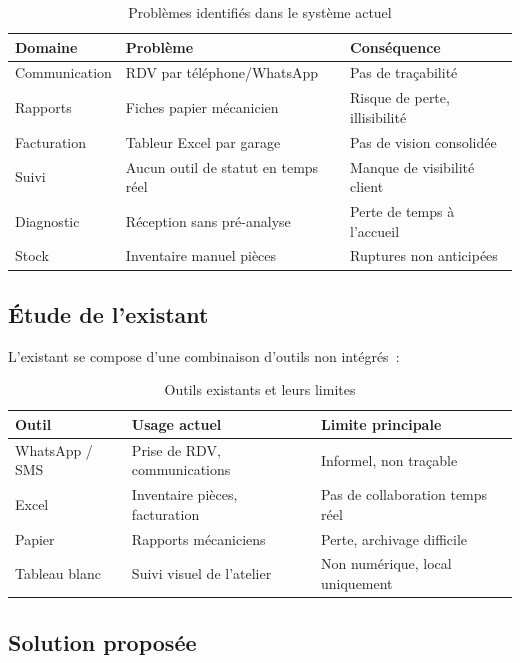 \begin{table}[H]
\centering
\caption{Problèmes identifiés dans le système actuel}
\label{tab:problemes}
\begin{tabularx}{\textwidth}{|l|X|X|}
\hline
\rowcolor{gray!20}
\textbf{Domaine} & \textbf{Problème} & \textbf{Conséquence} \\
\hline
Communication & RDV par téléphone/WhatsApp & Pas de traçabilité \\
\hline
Rapports & Fiches papier mécanicien & Risque de perte, illisibilité \\
\hline
Facturation & Tableur Excel par garage & Pas de vision consolidée \\
\hline
Suivi & Aucun outil de statut en temps réel & Manque de visibilité client \\
\hline
Diagnostic & Réception sans pré-analyse & Perte de temps à l'accueil \\
\hline
Stock & Inventaire manuel pièces & Ruptures non anticipées \\
\hline
\end{tabularx}
\end{table}

\subsection{Étude de l'existant}

L'existant se compose d'une combinaison d'outils non intégrés~:

\begin{table}[H]
\centering
\caption{Outils existants et leurs limites}
\label{tab:existant}
\begin{tabularx}{\textwidth}{|l|X|X|}
\hline
\rowcolor{gray!20}
\textbf{Outil} & \textbf{Usage actuel} & \textbf{Limite principale} \\
\hline
WhatsApp / SMS & Prise de RDV, communications & Informel, non traçable \\
\hline
Excel & Inventaire pièces, facturation & Pas de collaboration temps réel \\
\hline
Papier & Rapports mécaniciens & Perte, archivage difficile \\
\hline
Tableau blanc & Suivi visuel de l'atelier & Non numérique, local uniquement \\
\hline
\end{tabularx}
\end{table}

\subsection{Solution proposée}

